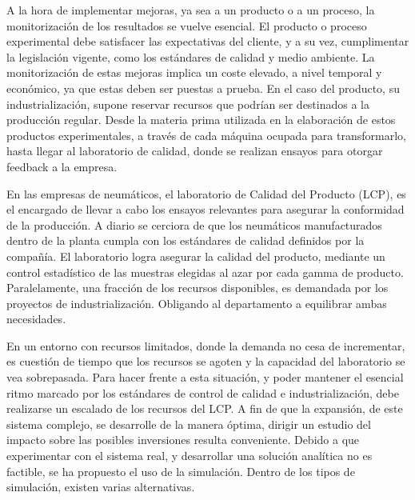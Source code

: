 A la hora de implementar mejoras, ya sea a un producto o a un proceso,
la monitorización de los resultados se vuelve esencial.
El producto o proceso experimental debe satisfacer las expectativas del cliente,
y a su vez, cumplimentar la legislación vigente,
como los estándares de calidad y medio ambiente.
La monitorización de estas mejoras implica un coste elevado,
a nivel temporal y económico, ya que estas deben ser puestas a prueba.
En el caso del producto, su industrialización,
supone reservar recursos que podrían ser destinados a la producción regular.
Desde la materia prima utilizada
en la elaboración de estos productos experimentales,
a través de cada máquina ocupada para transformarlo,
hasta llegar al laboratorio de calidad,
donde se realizan ensayos para otorgar feedback a la empresa.

En las empresas de neumáticos, el laboratorio de Calidad del Producto (LCP),
es el encargado de llevar a cabo los ensayos relevantes
para asegurar la conformidad de la producción.
A diario se cerciora de que los neumáticos manufacturados dentro de la planta
cumpla con los estándares de calidad definidos por la compañía.
El laboratorio logra asegurar la calidad del producto,
mediante un control estadístico de las muestras
elegidas al azar por cada gamma de producto.
Paralelamente, una fracción de los recursos disponibles,
es demandada por los proyectos de industrialización.
Obligando al departamento a equilibrar ambas necesidades.

En un entorno con recursos limitados,
donde la demanda no cesa de incrementar,
es cuestión de tiempo que los recursos se agoten
y la capacidad del laboratorio se vea sobrepasada.
Para hacer frente a esta situación,
y poder mantener el esencial ritmo
marcado por los estándares de control de calidad e industrialización,
debe realizarse un escalado de los recursos del LCP.
A fin de que la expansión, de este sistema complejo,
se desarrolle de la manera óptima,
dirigir  un estudio del impacto sobre
las posibles inversiones resulta conveniente.
Debido a que experimentar con el sistema real,
y desarrollar una solución analítica no es factible,
se ha propuesto el uso de la simulación.
Dentro de los tipos de simulación, existen varias alternativas.

